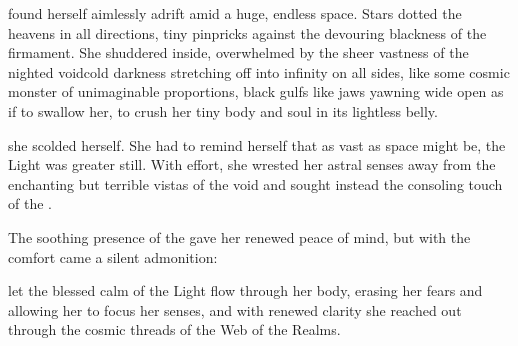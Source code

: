 
\Esmerel{} found herself aimlessly adrift amid a huge, endless space. Stars dotted the heavens in all directions, tiny pinpricks against the devouring blackness of the firmament. 
She shuddered inside, overwhelmed by the sheer vastness of the nighted void\dash cold darkness stretching off into infinity on all sides, 
like some cosmic monster of unimaginable proportions, black gulfs like jaws yawning wide open as if to swallow her, to crush her tiny body and soul in its lightless belly. 

 she scolded herself. 
She had to remind herself that as vast as space might be, the Light was greater still. 
With effort, she wrested her astral senses away from the enchanting but terrible vistas of the void and sought instead the consoling touch of the \sephiroth. 

The soothing presence of the \Archons{} gave her renewed peace of mind, 
but with the comfort came a silent admonition: 

% 

\Esmerel{} let the blessed calm of the Light flow through her body, erasing her fears and allowing her to focus her senses, and with renewed clarity she reached out through the cosmic threads of the Web of the Realms. 

